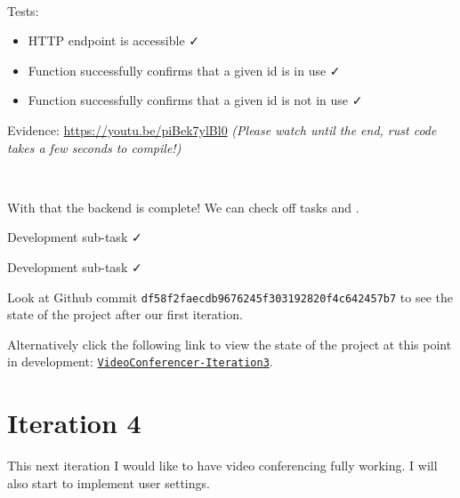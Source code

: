 {\color{gray} \hrulefill} \\ \vspace{0.2cm}

{\sffamily Tests:}

\begin{itemize}
\item HTTP endpoint is accessible \faCheck \\
\item Function successfully confirms that a given id is in use \faCheck \\
\item Function successfully confirms that a given id is not in use \faCheck \\
\end{itemize}

{\sffamily Evidence:} \url{https://youtu.be/piBek7ylBl0}
\textit{(Please watch until the end, rust code takes a
few seconds to compile!)}

{\color{gray} \hrulefill} \\ \vspace{0.2cm}

With that the backend is complete! We can check off tasks 
and .\\ \vspace{0.2cm}

{\sffamily Development sub-task}  \faCheck \\ \vspace{0.2cm}

{\sffamily Development sub-task}  \faCheck \\ \vspace{0.2cm}

Look at Github commit
\texttt{df58f2faecdb9676245f303192820f4c642457b7} to see the
state of the project after our first iteration. \\
\vspace{0.2cm}

Alternatively click the following link to view the state
of the project at this point in development:
\href{https://github.com/zzzNathan/Video-Conferencer/tree/df58f2faecdb9676245f303192820f4c642457b7}{\texttt{VideoConferencer-Iteration3}}.

\section{Iteration 4}

This next iteration I would like to have video conferencing
fully working. I will also start to implement user settings.
\\ \vspace{0.2cm}

